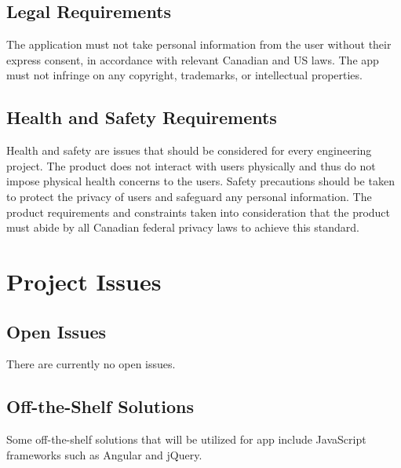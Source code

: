 \documentclass[12pt, titlepage]{article}
\newcommand{\pbox}[1]{\parbox[t]{.85\linewidth}{#1}
}
\newcommand{\myline}{%
	\kern1pt %
	\hrule height 0.8pt
	\kern3pt %
}
\newcommand{\requirement}[7]{

	\noindent
	\vspace{5pt}
	\parbox{\linewidth}{
		\fontsize{10pt}{5pt}\selectfont
		\noindent\textbf{#1} \hspace{26pt}\pbox{\textit{#2}} \\
		\myline
		\textit{Rationale:}	\hspace{10pt} \pbox{#3} \\
		\textit{Fit Criterion:} \pbox{#4} \\
		\textit{Priority:} \hspace{18pt} \pbox{#5} \\
		\textit{Originator:} \hspace{7pt} \pbox{#6} \\
		\textit{History:} \hspace{25pt}{#7} \\
}}
\newcommand{\descWidth}{5.13in}
\newcommand{\pbox}[1]{\parbox[t]{\descWidth}{#1}}
\newcommand{\myline}{%
	\kern1pt %
	\hrule height 0.8pt
	\kern3pt %
}
\begin{document}
\subsection{Legal Requirements}

The application must not take personal information from the user without their express consent, in accordance with relevant Canadian and US laws. The app must not infringe on any copyright, trademarks, or intellectual properties.

\subsection{Health and Safety Requirements}
Health and safety are issues that should be considered for every engineering project. The product does not interact with users physically and thus do not impose physical health concerns to the users. Safety precautions should be taken to protect the privacy of users and safeguard any personal information. The product requirements and constraints taken into consideration that the product must abide by all Canadian federal privacy laws to achieve this standard.

\section{Project Issues}

\subsection{Open Issues}
There are currently no open issues.

\subsection{Off-the-Shelf Solutions}
Some off-the-shelf solutions that will be utilized for app include JavaScript frameworks such as Angular and jQuery.
\end{document}
